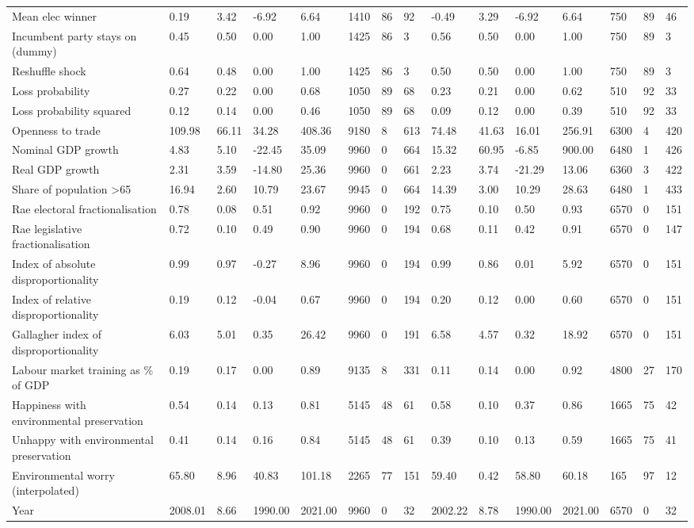 \begin{longtable}{lllllllllllllll}
Mean elec winner & 0.19 & 3.42 & -6.92 & 6.64 & 1410 & 86 & 92 & -0.49 & 3.29 & -6.92 & 6.64 & 750 & 89 & 46\\
Incumbent party stays on (dummy) & 0.45 & 0.50 & 0.00 & 1.00 & 1425 & 86 & 3 & 0.56 & 0.50 & 0.00 & 1.00 & 750 & 89 & 3\\
\addlinespace
Reshuffle shock & 0.64 & 0.48 & 0.00 & 1.00 & 1425 & 86 & 3 & 0.50 & 0.50 & 0.00 & 1.00 & 750 & 89 & 3\\
Loss probability & 0.27 & 0.22 & 0.00 & 0.68 & 1050 & 89 & 68 & 0.23 & 0.21 & 0.00 & 0.62 & 510 & 92 & 33\\
Loss probability squared & 0.12 & 0.14 & 0.00 & 0.46 & 1050 & 89 & 68 & 0.09 & 0.12 & 0.00 & 0.39 & 510 & 92 & 33\\
Openness to trade & 109.98 & 66.11 & 34.28 & 408.36 & 9180 & 8 & 613 & 74.48 & 41.63 & 16.01 & 256.91 & 6300 & 4 & 420\\
Nominal GDP growth & 4.83 & 5.10 & -22.45 & 35.09 & 9960 & 0 & 664 & 15.32 & 60.95 & -6.85 & 900.00 & 6480 & 1 & 426\\
\addlinespace
Real GDP growth & 2.31 & 3.59 & -14.80 & 25.36 & 9960 & 0 & 661 & 2.23 & 3.74 & -21.29 & 13.06 & 6360 & 3 & 422\\
Share of population >65 & 16.94 & 2.60 & 10.79 & 23.67 & 9945 & 0 & 664 & 14.39 & 3.00 & 10.29 & 28.63 & 6480 & 1 & 433\\
Rae electoral fractionalisation & 0.78 & 0.08 & 0.51 & 0.92 & 9960 & 0 & 192 & 0.75 & 0.10 & 0.50 & 0.93 & 6570 & 0 & 151\\
Rae legislative fractionalisation & 0.72 & 0.10 & 0.49 & 0.90 & 9960 & 0 & 194 & 0.68 & 0.11 & 0.42 & 0.91 & 6570 & 0 & 147\\
Index of absolute disproportionality & 0.99 & 0.97 & -0.27 & 8.96 & 9960 & 0 & 194 & 0.99 & 0.86 & 0.01 & 5.92 & 6570 & 0 & 151\\
\addlinespace
Index of relative disproportionality & 0.19 & 0.12 & -0.04 & 0.67 & 9960 & 0 & 194 & 0.20 & 0.12 & 0.00 & 0.60 & 6570 & 0 & 151\\
Gallagher index of disproportionality & 6.03 & 5.01 & 0.35 & 26.42 & 9960 & 0 & 191 & 6.58 & 4.57 & 0.32 & 18.92 & 6570 & 0 & 151\\
Labour market training as \% of GDP & 0.19 & 0.17 & 0.00 & 0.89 & 9135 & 8 & 331 & 0.11 & 0.14 & 0.00 & 0.92 & 4800 & 27 & 170\\
Happiness with environmental preservation & 0.54 & 0.14 & 0.13 & 0.81 & 5145 & 48 & 61 & 0.58 & 0.10 & 0.37 & 0.86 & 1665 & 75 & 42\\
Unhappy with environmental preservation & 0.41 & 0.14 & 0.16 & 0.84 & 5145 & 48 & 61 & 0.39 & 0.10 & 0.13 & 0.59 & 1665 & 75 & 41\\
\addlinespace
Environmental worry (interpolated) & 65.80 & 8.96 & 40.83 & 101.18 & 2265 & 77 & 151 & 59.40 & 0.42 & 58.80 & 60.18 & 165 & 97 & 12\\
Year & 2008.01 & 8.66 & 1990.00 & 2021.00 & 9960 & 0 & 32 & 2002.22 & 8.78 & 1990.00 & 2021.00 & 6570 & 0 & 32\\
\bottomrule
\end{longtable}
